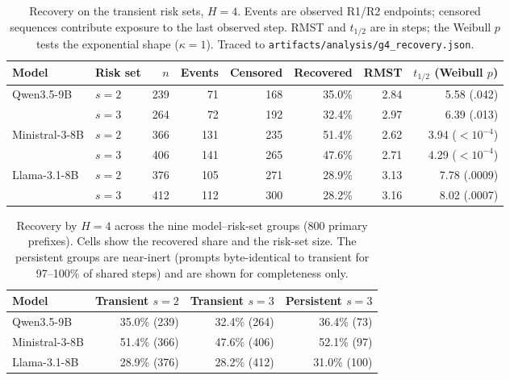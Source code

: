 \documentclass[a4paper,fleqn]{cas-sc}
\begin{document}
\begin{table}[pos=htbp]
  \centering
  \caption{Recovery on the transient risk sets, $H=4$. Events are observed R1/R2 endpoints;
  censored sequences contribute exposure to the last observed step. RMST and $t_{1/2}$ are in
  steps; the Weibull $p$ tests the exponential shape ($\kappa=1$). Traced to
  \texttt{artifacts/analysis/g4\_recovery.json}.}
  \label{tab:recovery}
  \footnotesize
  \setlength{\tabcolsep}{4pt}
  \begin{tabular}{llrrrrrr}
    \toprule
    \textbf{Model} & \textbf{Risk set} & $n$ & \textbf{Events} & \textbf{Censored} & \textbf{Recovered} & \textbf{RMST} & \textbf{$t_{1/2}$ (Weibull $p$)} \\
    \midrule
    Qwen3.5-9B     & $s=2$ & 239 & 71  & 168 & 35.0\% & 2.84 & 5.58 (.042) \\
                   & $s=3$ & 264 & 72  & 192 & 32.4\% & 2.97 & 6.39 (.013) \\
    Ministral-3-8B & $s=2$ & 366 & 131 & 235 & 51.4\% & 2.62 & 3.94 ($<10^{-4}$) \\
                   & $s=3$ & 406 & 141 & 265 & 47.6\% & 2.71 & 4.29 ($<10^{-4}$) \\
    Llama-3.1-8B   & $s=2$ & 376 & 105 & 271 & 28.9\% & 3.13 & 7.78 (.0009) \\
                   & $s=3$ & 412 & 112 & 300 & 28.2\% & 3.16 & 8.02 (.0007) \\
    \bottomrule
  \end{tabular}
\end{table}

\begin{table}[pos=htbp]
  \centering
  \caption{Recovery by $H=4$ across the nine model--risk-set groups (800 primary prefixes).
  Cells show the recovered share and the risk-set size. The persistent groups are near-inert
  (prompts byte-identical to transient for 97--100\% of shared steps) and are shown for
  completeness only.}
  \label{tab:recovery_all}
  \small
  \begin{tabular}{lrrr}
    \toprule
    \textbf{Model} & \textbf{Transient $s=2$} & \textbf{Transient $s=3$} & \textbf{Persistent $s=3$} \\
    \midrule
    Qwen3.5-9B     & 35.0\% (239) & 32.4\% (264) & 36.4\% (73) \\
    Ministral-3-8B & 51.4\% (366) & 47.6\% (406) & 52.1\% (97) \\
    Llama-3.1-8B   & 28.9\% (376) & 28.2\% (412) & 31.0\% (100) \\
    \bottomrule
  \end{tabular}
\end{table}
\end{document}
